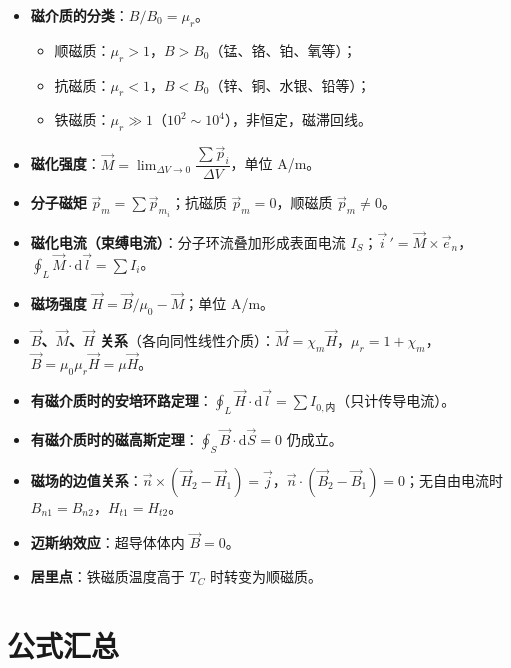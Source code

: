 \documentclass[12pt,a4paper]{ctexart}
\begin{document}
\begin{itemize}
    \item \textbf{磁介质的分类}：$B/B_0=\mu_r$。
    \begin{itemize}
        \item 顺磁质：$\mu_r>1$，$B>B_0$（锰、铬、铂、氧等）；
        \item 抗磁质：$\mu_r<1$，$B<B_0$（锌、铜、水银、铅等）；
        \item 铁磁质：$\mu_r\gg 1$（$10^2\sim10^4$），非恒定，磁滞回线。
    \end{itemize}
    \item \textbf{磁化强度}：$\vec M=\displaystyle\lim_{\Delta V\to 0}\dfrac{\sum\vec p_i}{\Delta V}$，单位 A/m。
    \item \textbf{分子磁矩} $\vec p_m=\sum\vec p_{m_i}$；抗磁质 $\vec p_m=0$，顺磁质 $\vec p_m\neq 0$。
    \item \textbf{磁化电流（束缚电流）}：分子环流叠加形成表面电流 $I_S$；$\vec i\,'=\vec M\times\vec e_n$，$\displaystyle\oint_L\vec M\cdot\mathrm d\vec l=\sum I_i$。
    \item \textbf{磁场强度} $\vec H=\vec B/\mu_0-\vec M$；单位 A/m。
    \item \textbf{$\vec B$、$\vec M$、$\vec H$ 关系}（各向同性线性介质）：$\vec M=\chi_m\vec H$，$\mu_r=1+\chi_m$，$\vec B=\mu_0\mu_r\vec H=\mu\vec H$。
    \item \textbf{有磁介质时的安培环路定理}：$\displaystyle\oint_L\vec H\cdot\mathrm d\vec l=\sum I_{0,\text{内}}$（只计传导电流）。
    \item \textbf{有磁介质时的磁高斯定理}：$\displaystyle\oint_S\vec B\cdot\mathrm d\vec S=0$ 仍成立。
    \item \textbf{磁场的边值关系}：$\vec n\times(\vec H_2-\vec H_1)=\vec j$，$\vec n\cdot(\vec B_2-\vec B_1)=0$；无自由电流时 $B_{n1}=B_{n2}$，$H_{t1}=H_{t2}$。
    \item \textbf{迈斯纳效应}：超导体体内 $\vec B=0$。
    \item \textbf{居里点}：铁磁质温度高于 $T_C$ 时转变为顺磁质。
\end{itemize}

\section{公式汇总}
\end{document}
